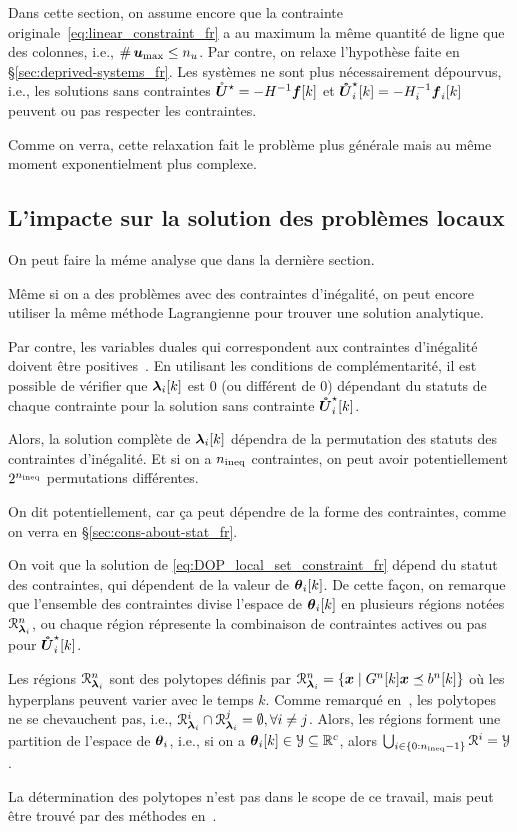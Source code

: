 \documentclass[../main.tex]{subfiles}
\begin{document}
Dans cette section, on assume encore que la contrainte originale~\eqref{eq:linear_constraint_fr} a au maximum la même quantité de ligne que des colonnes, i.e., $\operatorname{\#}{\boldsymbol{u}_{\max}}\leq n_{u}$.
Par contre, on relaxe l'hypothèse faite en \S\ref{sec:deprived-systems_fr}.
Les systèmes ne sont plus nécessairement dépourvus, i.e., les solutions sans contraintes
${\mathring{\boldsymbol{U}}^{\star}}=-H^{-1}\boldsymbol{f}[k]$ et $\optuncUik=-H_{i}^{-1}\vec{f}_{i}[k]$ peuvent ou pas respecter les contraintes.

Comme on verra, cette relaxation fait le problème plus générale mais au même moment exponentielment plus complexe.

\subsection{L'impacte sur la solution des problèmes locaux}\label{sec:impact-local-problem_fr}
On peut faire la méme analyse que dans la dernière section.

Même si on a des problèmes \qp{} avec des contraintes d'inégalité, on peut encore utiliser la même méthode Lagrangienne pour trouver une solution analytique.

Par contre, les variables duales qui correspondent aux contraintes d'inégalité doivent être positives~\cite{BoydVandenberghe2004}.
En utilisant les conditions de complémentarité, il est possible de vérifier que $\lambdaik$ est $0$ (ou différent de $0$) dépendant du statuts de chaque contrainte pour la solution sans contrainte $\optuncUik$.

Alors, la solution complète de $\lambdaik$ dépendra de la permutation des statuts des contraintes d'inégalité.
Et si on a $n_{\text{ineq}}$ contraintes, on peut avoir potentiellement $2^{n_{\text{ineq}}}$ permutations différentes.
\begin{remark}
  On dit potentiellement, car ça peut dépendre de la forme des contraintes, comme on verra en \S\ref{sec:cons-about-stat_fr}.
\end{remark}

On voit que la solution de \eqref{eq:DOP_local_set_constraint_fr} dépend du statut des contraintes, qui dépendent de la valeur de $\thetaik$.
De cette façon, on remarque que l'ensemble des contraintes divise l'espace de $\thetaik$ en plusieurs régions notées $\mathcal{R}_{\boldsymbol{\lambda}_{i}}^{n}$, ou chaque région répresente la combinaison de contraintes actives ou pas pour $\optuncUik$.

Les régions $\mathcal{R}_{\boldsymbol{\lambda}_{i}}^{n}$ sont des polytopes définis par ${\mathcal{R}_{\boldsymbol{\lambda}_{i}}^{n}=\{\boldsymbol{x}\mid G^{n}[k]\boldsymbol{x} \preceq b^{n}[k]\}}$ où les hyperplans peuvent varier avec le temps $k$.
Comme remarqué en~\cite{BemporadEtAl2002}, les polytopes ne se chevauchent pas, i.e., ${\mathcal{R}_{\boldsymbol{\lambda}_{i}}^{i}\cap\mathcal{R}_{\boldsymbol{\lambda}_{i}}^{j}=\emptyset, \forall i\neq j}$.
Alors, les régions forment une partition de l'espace de $\boldsymbol{\theta}_{i}$, i.e., si on a $\thetaik\in\set{Y}\subseteq\R^{c}$, alors ${\bigcup_{i\in\{0:n_{\text{ineq}}-1\}}\mathcal{R}^{i}=\mathcal{Y}}$.
\begin{remark}
  La détermination des polytopes n'est pas dans le scope de ce travail, mais peut être trouvé par des méthodes en~\cite[\S4.1.3.2]{LauerBloch2019}.
\end{remark}
\end{document}
